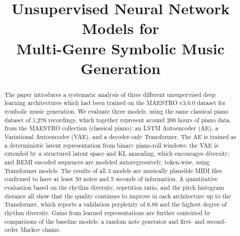 \documentclass[conference]{IEEEtran}
\begin{document}
\title{Unsupervised Neural Network Models for\\Multi-Genre Symbolic Music Generation}

\author{
\and
{}
\and
{}
}

\maketitle

\begin{abstract}
The paper introduces a systematic analysis of three different unsupervised deep learning architectures which had been trained on the MAESTRO v3.0.0 dataset for symbolic music generation. We evaluate three models, using the same classical piano dataset of 1,276 recordings, which together represent around 200 hours of piano data, from the MAESTRO collection (classical piano): an LSTM Autoencoder (AE), a Variational Autoencoder (VAE), and a decoder-only Transformer. The AE is trained as a deterministic latent representation from binary piano-roll windows; the VAE is extended by a structured latent space and KL annealing, which encourages diversity; and REMI encoded sequences are modeled autoregressively, token-wise, using Transformer models. The results of all 3 models are musically plausible MIDI files confirmed to have at least 50 notes and 5 seconds of information. A quantitative evaluation based on the rhythm diversity, repetition ratio, and the pitch histogram distance all show that the quality continues to improve in each architecture up to the Transformer, which reports a validation perplexity of 6.88 and the highest degree of rhythm diversity. Gains from learned representations are further contexted by comparisons of the baseline models: a random note generator and first- and second-order Markov chains.
\end{abstract}
\end{document}
